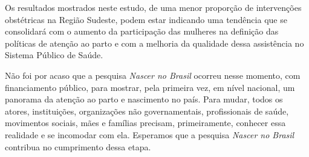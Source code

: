 \documentclass{article}
\begin{document}
Os resultados mostrados neste estudo, de uma menor proporção de intervenções
obstétricas
na Região Sudeste, podem estar indicando uma tendência que se consolidará com o
aumento
da participação das mulheres na definição das políticas de atenção ao parto e
com a
melhoria da qualidade dessa assistência no Sistema Público de Saúde.

Não foi por acaso que a pesquisa \textit{Nascer no Brasil}
ocorreu nesse momento,
com financiamento público, para mostrar, pela primeira vez, em nível nacional,
um
panorama da atenção ao parto e nascimento no país. Para mudar, todos os atores,
instituições, organizações não governamentais, profissionais de saúde,
movimentos
sociais, mães e famílias precisam, primeiramente, conhecer essa realidade e se
incomodar
com ela. Esperamos que a pesquisa \textit{Nascer no Brasil}
contribua no
cumprimento dessa etapa.
\end{document}

